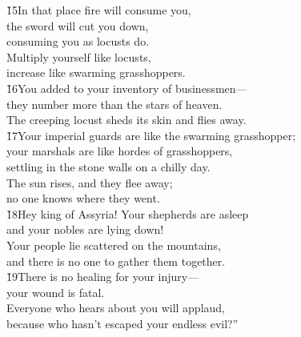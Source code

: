 \begin{poetry}
\poeml \v{15}In that place fire will consume you, \\
\poemll    the sword will cut you down, \\
\poemlll       consuming you as locusts do. \\
\poeml Multiply yourself like locusts, \\
\poemll    increase like swarming grasshoppers. \\
\poeml \v{16}You added to your inventory of businessmen--- \\
\poemll    they number more than the stars of heaven. \\
\poeml The creeping locust sheds its skin and flies away. \\
\poeml \v{17}Your imperial guards are like the swarming grasshopper; \\
\poemll    your marshals are like hordes of grasshoppers, \\
\poemlll       settling in the stone walls on a chilly day. \\
\poeml The sun rises, and they flee away; \\
\poemll    no one knows where they went. \\
\poeml \v{18}Hey king of Assyria! Your shepherds are asleep \\
\poemll    and your nobles are lying down! \\
\poeml Your people lie scattered on the mountains, \\
\poemll    and there is no one to gather them together. \\
\poeml \v{19}There is no healing for your injury--- \\
\poemll    your wound is fatal. \\
\poeml Everyone who hears about you will applaud, \\
\poemll    because who hasn't escaped your endless evil?''\end{poetry}
